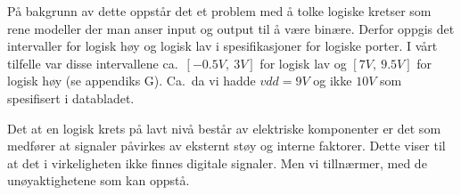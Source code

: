     På bakgrunn av dette oppstår det et problem med å tolke logiske kretser som rene modeller der man anser input og output til å være binære.
    Derfor oppgis det intervaller for logisk høy og logisk lav i spesifikasjoner for logiske porter.
    I vårt tilfelle var disse intervallene ca.\ $[-0.5V,\ 3V]$ for logisk lav og $[7V,\ 9.5V]$ for logisk høy (se appendiks G).
    Ca.\ da vi hadde $vdd=9V$ og ikke $10V$ som spesifisert i databladet.

    Det at en logisk krets på lavt nivå består av elektriske komponenter er det som medfører at signaler påvirkes av eksternt støy og interne faktorer.
    Dette viser til at det i virkeligheten ikke finnes digitale signaler.
    Men vi tillnærmer, med de unøyaktighetene som kan oppstå.